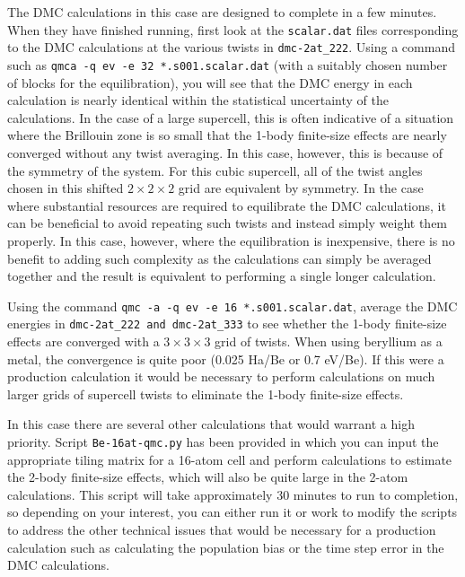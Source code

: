 The DMC calculations in this case are designed to complete in a few minutes.  When they have finished running, first look at the \texttt{scalar.dat} files corresponding to the DMC calculations at the various twists in \texttt{dmc-2at\_222}.  Using a command such as \texttt{qmca -q ev -e 32 *.s001.scalar.dat} (with a suitably chosen number of blocks for the equilibration), you will see that the DMC energy in each calculation is nearly identical within the statistical uncertainty of the calculations.  In the case of a large supercell, this is often indicative of a situation where the Brillouin zone is so small that the 1-body finite-size effects are nearly converged without any twist averaging.  In this case, however, this is because of the symmetry of the system.  For this cubic supercell, all of the twist angles chosen in this shifted $2\times2\times2$ grid are equivalent by symmetry.  In the case where substantial resources are required to equilibrate the DMC calculations, it can be beneficial to avoid repeating such twists and instead simply weight them properly.  In this case, however, where the equilibration is inexpensive, there is no benefit to adding such complexity as the calculations can simply be averaged together and the result is equivalent to performing a single longer calculation.

Using the command \texttt{qmc -a -q ev -e 16 *.s001.scalar.dat}, average the DMC energies in \texttt{dmc-2at\_222 and dmc-2at\_333} to see whether the 1-body finite-size effects are converged with a $3\times3\times3$ grid of twists.  When using beryllium as a metal, the convergence is quite poor (0.025 Ha/Be or 0.7 eV/Be).  If this were a production calculation it would be necessary to perform calculations on much larger grids of supercell twists to eliminate the 1-body finite-size effects.

In this case there are several other calculations that would warrant a high priority.  Script \texttt{Be-16at-qmc.py} has been provided in which you can input the appropriate tiling matrix for a 16-atom cell and perform calculations to estimate the 2-body finite-size effects, which will also be quite large in the 2-atom calculations.  This script will take approximately 30 minutes to run to completion, so depending on your interest,  you can either run it or work to modify the scripts to address the other technical issues that would be necessary for a production calculation such as calculating the population bias or the time step error in the DMC calculations.  

